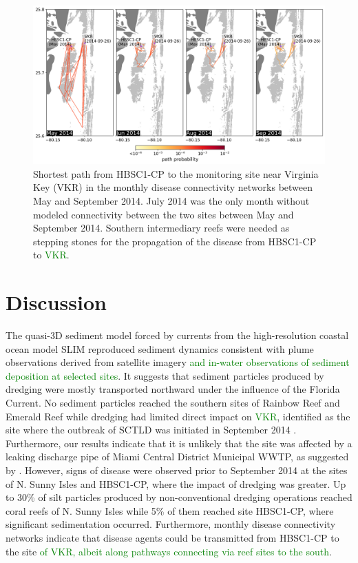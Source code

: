 \documentclass[preprint,12pt,authoryear]{elsarticle}
\newcommand{\modif}[1]{\textcolor{green}{#1}}
\begin{document}
\begin{figure}
	\centering
	\includegraphics[width=\textwidth]{figures/fig_paths_new.png}
	\caption{Shortest path from HBSC1-CP to the monitoring site near Virginia Key (VKR) in the monthly disease connectivity networks between May and September 2014. July 2014 was the only month without modeled connectivity between the two sites between May and September 2014. Southern intermediary reefs were needed as stepping stones for the propagation of the disease from HBSC1-CP to \modif{VKR}.}
	\label{fig:onset_path}
\end{figure}

\section{Discussion}

The quasi-3D sediment model forced by currents from the high-resolution coastal ocean model SLIM reproduced sediment dynamics consistent with plume observations derived from satellite imagery \modif{and in-water observations of sediment deposition at selected sites}. It suggests that sediment particles produced by dredging were mostly transported northward under the influence of the Florida Current. No sediment particles reached the southern sites of Rainbow Reef and Emerald Reef while dredging had limited direct impact on \modif{VKR}, identified as the site where the outbreak of SCTLD was initiated in September 2014 \citep{precht2016unprecedented}. Furthermore, our results indicate that it is unlikely that the site was affected by a leaking discharge pipe of Miami Central District Municipal WWTP, as suggested by \cite{gintert2019regional}. However, signs of disease were observed prior to September 2014 at the sites of N. Sunny Isles and HBSC1-CP, where the impact of dredging was greater. Up to 30\% of silt particles produced by non-conventional dredging operations reached coral reefs of N. Sunny Isles while 5\% of them reached site HBSC1-CP, where significant sedimentation occurred. Furthermore, monthly disease connectivity networks indicate that disease agents could be transmitted from HBSC1-CP to the site \modif{of VKR, albeit along pathways connecting via reef sites to the south}.   
\end{document}
